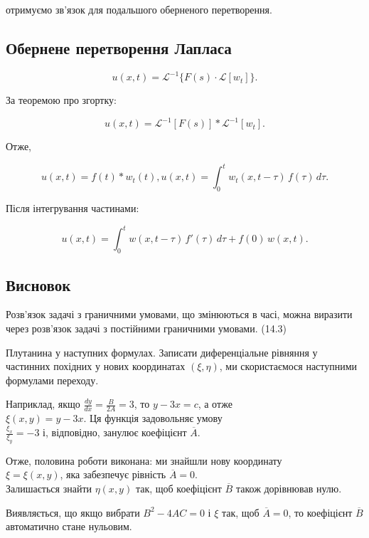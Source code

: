 \documentclass[
  ukrainian,
]{article}
\begin{document}
отримуємо зв'язок для подальшого оберненого перетворення.

\subsection{Обернене перетворення
Лапласа}\label{ux43eux431ux435ux440ux43dux435ux43dux435-ux43fux435ux440ux435ux442ux432ux43eux440ux435ux43dux43dux44f-ux43bux430ux43fux43bux430ux441ux430}

\[
u(x, t) = \mathcal{L}^{-1}\{F(s)\cdot \mathcal{L}[w_t]\}.
\]

За теоремою про згортку:

\[
u(x, t) = \mathcal{L}^{-1}[F(s)] * \mathcal{L}^{-1}[w_t].
\]

Отже,

\[
u(x, t) = f(t) * w_t(t),
u(x, t) = \int_0^t w_t(x, t-\tau)\, f(\tau)\, d\tau.
\]

Після інтегрування частинами:

\[
u(x, t) = \int_{0}^{t} w(x, t-\tau)\, f'(\tau)\, d\tau + f(0)\, w(x, t).
\]

\subsection{Висновок}\label{ux432ux438ux441ux43dux43eux432ux43eux43a}

Розв'язок задачі з граничними умовами, що змінюються в часі, можна
виразити через розв'язок задачі з постійними граничними умовами. (14.3)

Плутанина у наступних формулах. Записати диференціальне рівняння у
частинних похідних у нових координатах \((\xi, \eta)\), ми скористаємося
наступними формулами переходу.

Наприклад, якщо \(\frac{dy}{dx} = \frac{B}{2A} = 3\), то \(y - 3x = c\),
а отже\\
\(\xi(x, y) = y - 3x\). Ця функція задовольняє умову\\
\(\frac{\xi_x}{\xi_y} = -3\) і, відповідно, занулює коефіцієнт
\(\overline{A}\).

Отже, половина роботи виконана: ми знайшли нову координату\\
\(\xi = \xi(x, y)\), яка забезпечує рівність \(\overline{A} = 0\).\\
Залишається знайти \(\eta(x, y)\) так, щоб коефіцієнт \(\overline{B}\)
також дорівнював нулю.

Виявляється, що якщо вибрати \(B^2 - 4AC = 0\) і \(\xi\) так, щоб
\(\overline{A} = 0\), то коефіцієнт \(\overline{B}\) автоматично стане
нульовим.
\end{document}
